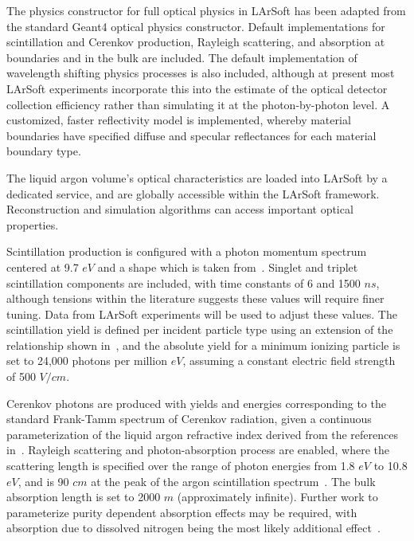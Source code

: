\documentclass[12pt]{elsarticle}
\newcommand{\larsoft}{LArSoft }
\begin{document}
The physics constructor for full optical physics in \larsoft has been adapted from the standard Geant4 optical physics constructor. Default implementations for scintillation and Cerenkov production, Rayleigh scattering, and absorption at boundaries and in the bulk are included. The default implementation of wavelength shifting physics processes is also included, although at present most \larsoft experiments incorporate this into the estimate of the optical detector collection efficiency rather than simulating it at the photon-by-photon level.  A customized, faster reflectivity model is implemented, whereby material boundaries have specified diffuse and specular reflectances for each material boundary type.  

The liquid argon volume's optical characteristics are loaded into \larsoft by a dedicated service, and are globally accessible within the \larsoft framework.  Reconstruction and simulation algorithms can access important optical properties.

Scintillation production is configured with a photon momentum spectrum centered at 9.7 $eV$ and a shape which is taken from~\cite{spectrum}.  Singlet and triplet scintillation components are included, with time constants of 6 and 1500 $ns$, although tensions within the literature suggests these values will require finer tuning.\cite{fastslow}\cite{fastslow2}\cite{fastslow3}\cite{fastslow4}
Data from \larsoft experiments will be used to adjust these values.  The scintillation yield is defined per incident particle type using an extension of the relationship shown in~\cite{scintyield}, and the absolute yield for a minimum ionizing particle is set to 24,000 photons per million $eV$, assuming a constant electric field strength of 500 $V/cm$. 

Cerenkov photons are produced with yields and energies corresponding to the standard Frank-Tamm spectrum of Cerenkov radiation, given a continuous parameterization of the liquid argon refractive index derived from the references in~\cite{RIndex}. Rayleigh scattering and photon-absorption process are enabled, where the scattering length is specified over the range of photon energies from 1.8 $eV$ to 10.8 $eV$, and is 90 $cm$ at the peak of the argon scintillation spectrum~\cite{Rlength}.  The bulk absorption length is set to 2000 $m$ (approximately infinite). Further work to parameterize purity dependent absorption effects may be required, with absorption due to dissolved nitrogen being the most likely additional effect~\cite{nitrogen}.
\end{document}
